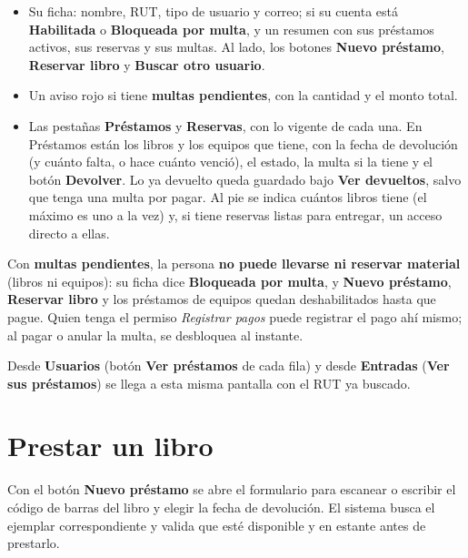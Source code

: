 \documentclass[11pt,a4paper]{report}
\begin{document}
\begin{itemize}
  \item Su ficha: nombre, RUT, tipo de usuario y correo; si su cuenta está
  \textbf{Habilitada} o \textbf{Bloqueada por multa}, y un resumen con sus
  préstamos activos, sus reservas y sus multas. Al lado, los botones
  \textbf{Nuevo préstamo}, \textbf{Reservar libro} y \textbf{Buscar otro
  usuario}.
  \item Un aviso rojo si tiene \textbf{multas pendientes}, con la cantidad
  y el monto total.
  \item Las pestañas \textbf{Préstamos} y \textbf{Reservas}, con lo vigente
  de cada una. En Préstamos están los libros y los equipos que tiene, con
  la fecha de devolución (y cuánto falta, o hace cuánto venció), el estado,
  la multa si la tiene y el botón \textbf{Devolver}. Lo ya devuelto queda
  guardado bajo \textbf{Ver devueltos}, salvo que tenga una multa por
  pagar. Al pie se indica cuántos libros tiene (el máximo es uno a la vez)
  y, si tiene reservas listas para entregar, un acceso directo a ellas.
\end{itemize}

\begin{importante}
Con \textbf{multas pendientes}, la persona \textbf{no puede llevarse ni
reservar material} (libros ni equipos): su ficha dice \textbf{Bloqueada por
multa}, y \textbf{Nuevo préstamo}, \textbf{Reservar libro} y los préstamos
de equipos quedan deshabilitados hasta que pague. Quien tenga el permiso
\textit{Registrar pagos} puede registrar el pago ahí mismo; al pagar o
anular la multa, se desbloquea al instante.
\end{importante}


\begin{nota}
Desde \textbf{Usuarios} (botón \textbf{Ver préstamos} de cada fila) y desde
\textbf{Entradas} (\textbf{Ver sus préstamos}) se llega a esta misma
pantalla con el RUT ya buscado.
\end{nota}

\section{Prestar un libro}

Con el botón \textbf{Nuevo préstamo} se abre el formulario para escanear
o escribir el código de barras del libro y elegir la fecha de devolución.
El sistema busca el ejemplar correspondiente y valida que esté disponible
y en estante antes de prestarlo.
\end{document}
